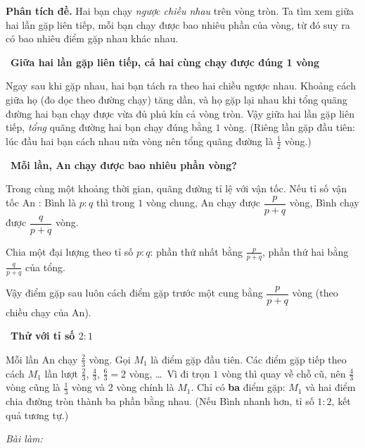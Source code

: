 \documentclass[11pt]{article}
\newif\ifsol \solfalse
\newcommand{\probsol}[1]{%
  \begin{lrbox}{\solmeasure}\begin{minipage}{\dimexpr\linewidth-24pt\relax}#1\end{minipage}\end{lrbox}%
  \ifsol
    \begin{solbox}#1\end{solbox}%
  \else
    \setlength{\solht}{\dimexpr\ht\solmeasure+\dp\solmeasure+0.85cm\relax}%
    \ifdim\solht<1.35cm\setlength{\solht}{1.35cm}\fi
    \ifdim\solht>\StudentMaxWork\setlength{\solht}{\StudentMaxWork}\fi
    \begin{tcolorbox}[colback=white,colframe=Line,boxrule=0.8pt,arc=5pt,
      left=8pt,right=8pt,top=4pt,bottom=4pt,height=\solht]{\footnotesize\color{Slate}\itshape\WorkWord}\end{tcolorbox}%
  \fi}
\newlength{\StudentMaxWork}\setlength{\StudentMaxWork}{7.5cm}
\newcommand{\step}[2]{\par\smallskip\noindent{\bfseries\color{tmBlue!85!black}\StepWord~#1.}\ {\bfseries #2}\par\nopagebreak}
\def\WorkWord{Bài làm:}
\def\StepWord{Bước}
\begin{document}
\probsol{
\textbf{Phân tích đề.} Hai bạn chạy \emph{ngược chiều nhau} trên vòng tròn. Ta tìm xem giữa hai lần gặp liên tiếp, mỗi bạn chạy được bao nhiêu phần của vòng, từ đó suy ra có bao nhiêu điểm gặp nhau khác nhau.

\step{1}{Giữa hai lần gặp liên tiếp, cả hai cùng chạy được đúng 1 vòng}
\begin{proofbox}Ngay sau khi gặp nhau, hai bạn tách ra theo hai chiều ngược nhau. Khoảng cách giữa họ (đo dọc theo đường chạy) tăng dần, và họ gặp lại nhau khi tổng quãng đường hai bạn chạy được vừa đủ phủ kín cả vòng tròn. Vậy giữa hai lần gặp liên tiếp, \emph{tổng} quãng đường hai bạn chạy đúng bằng $1$ vòng. (Riêng lần gặp đầu tiên: lúc đầu hai bạn cách nhau nửa vòng nên tổng quãng đường là $\frac12$ vòng.)\end{proofbox}

\step{2}{Mỗi lần, An chạy được bao nhiêu phần vòng?}
Trong cùng một khoảng thời gian, quãng đường tỉ lệ với vận tốc. Nếu tỉ số vận tốc An : Bình là $p:q$ thì trong $1$ vòng chung, An chạy được $\dfrac{p}{p+q}$ vòng, Bình chạy được $\dfrac{q}{p+q}$ vòng.
\begin{recallbox}Chia một đại lượng theo tỉ số $p:q$: phần thứ nhất bằng $\frac{p}{p+q}$, phần thứ hai bằng $\frac{q}{p+q}$ của tổng.\end{recallbox}
Vậy điểm gặp sau luôn cách điểm gặp trước một cung bằng $\dfrac{p}{p+q}$ vòng (theo chiều chạy của An).

\step{3}{Thử với tỉ số $2:1$}
Mỗi lần An chạy $\frac{2}{3}$ vòng. Gọi $M_1$ là điểm gặp đầu tiên. Các điểm gặp tiếp theo cách $M_1$ lần lượt $\frac23$, $\frac43$, $\frac63=2$ vòng, \dots\ Vì đi trọn $1$ vòng thì quay về chỗ cũ, nên $\frac43$ vòng cũng là $\frac13$ vòng và $2$ vòng chính là $M_1$. Chỉ có \textbf{ba} điểm gặp: $M_1$ và hai điểm chia đường tròn thành ba phần bằng nhau. (Nếu Bình nhanh hơn, tỉ số $1:2$, kết quả tương tự.)

}
\end{document}
